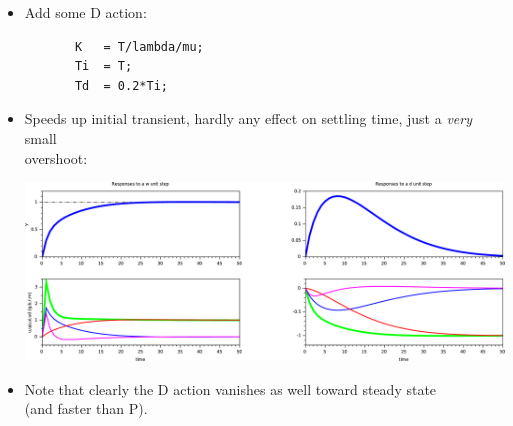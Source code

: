 \begin{frame}[fragile]
\myPause
 \begin{itemize}[<+-| alert@+>]
 \item Add some D action:
       {\scriptsize
       \begin{verbatim}
       K   = T/lambda/mu;
       Ti  = T;
       Td  = 0.2*Ti;
       \end{verbatim}
       }
 \item \vspace{-3mm}Speeds up initial transient, hardly any effect on settling time, just a \emph{very} small\\
       overshoot:
       \begin{center}
        \includegraphics[width=0.60\columnwidth]{./Unit-07/img/PIDactions-scilab-02.pdf}
       \end{center}
 \item Note that clearly the D action vanishes as well toward steady state \\
       (and faster than P). 
 \end{itemize}
\end{frame}

